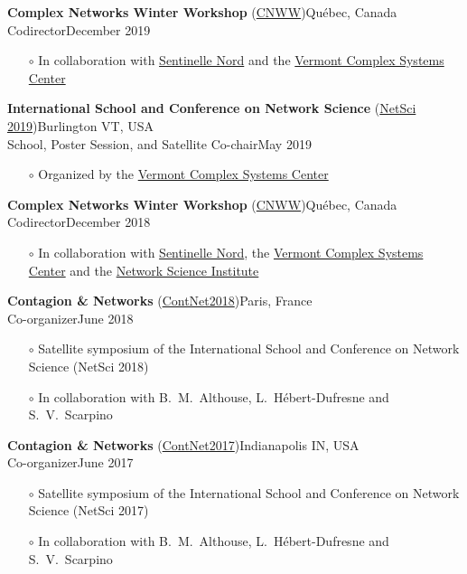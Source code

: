 \documentclass[11pt]{article}
\begin{document}
%
\parbox{\textwidth}{\textbf{Complex Networks Winter Workshop} (\href{https://sentinellenord.ulaval.ca/fr/reseauxcomplexes2019}{CNWW})\hfill Qu\'ebec, Canada\\
Codirector\hfill December 2019
\begin{itemize}[leftmargin=1.5em]\small
  \item[$\circ$] In collaboration with \href{http://sentinellenord.ulaval.ca/}{Sentinelle Nord} and the \href{http://www.vermontcomplexsystems.org/}{Vermont Complex Systems Center}
\end{itemize}}
%
\parbox{\textwidth}{\textbf{International School and Conference on Network Science} (\href{http://vermontcomplexsystems.org/events/netsci/}{NetSci 2019})\hfill Burlington VT, USA\\
School, Poster Session, and Satellite Co-chair\hfill May 2019
\begin{itemize}[leftmargin=1.5em]\small
  \item[$\circ$] Organized by the \href{http://www.vermontcomplexsystems.org/}{Vermont Complex Systems Center}
\end{itemize}}
%
\parbox{\textwidth}{\textbf{Complex Networks Winter Workshop} (\href{https://sentinellenord.ulaval.ca/fr/reseauxcomplexes2018}{CNWW})\hfill Qu\'ebec, Canada\\
Codirector\hfill December 2018
\begin{itemize}[leftmargin=1.5em]\small
  \item[$\circ$] In collaboration with \href{http://sentinellenord.ulaval.ca/}{Sentinelle Nord}, the \href{http://www.vermontcomplexsystems.org/}{Vermont Complex Systems Center} and the \href{https://www.networkscienceinstitute.org/}{Network Science Institute}
\end{itemize}}
%
\parbox{\textwidth}{\textbf{Contagion \& Networks} (\href{http://networkscontagion.github.io/}{ContNet2018})\hfill Paris, France\\
Co-organizer\hfill June 2018
\begin{itemize}[leftmargin=1.5em]\small
  \item[$\circ$] Satellite symposium of the International School and Conference on Network Science (NetSci 2018)
  \item[$\circ$] In collaboration with B.~M.~Althouse, L.~H\'ebert-Dufresne and S.~V.~Scarpino
\end{itemize}}
%
\parbox{\textwidth}{\textbf{Contagion \& Networks} (\href{http://networkscontagion.github.io/contnet2017/}{ContNet2017})\hfill Indianapolis IN, USA\\
Co-organizer\hfill June 2017
\begin{itemize}[leftmargin=1.5em]\small
  \item[$\circ$] Satellite symposium of the International School and Conference on Network Science (NetSci 2017)
  \item[$\circ$] In collaboration with B.~M.~Althouse, L.~H\'ebert-Dufresne and S.~V.~Scarpino
\end{itemize}} \vspace{0.75\baselineskip} \\
\end{document}
